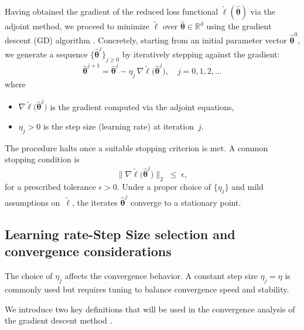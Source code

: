 Having obtained the gradient of the reduced loss functional $\tilde\ell(\hat{\bm\theta})$ via the adjoint method, we proceed to minimize $\tilde\ell$ over $\hat{\bm\theta}\in\mathbb{R}^d$ using the gradient descent (GD) algorithm \cite{ruder2017overviewgradientdescentoptimization,SENGUPTA2014521}.  Concretely, starting from an initial parameter vector $\hat{\bm\theta}^0$, we generate a sequence $\{\hat{\bm\theta}^j\}_{j\ge0}$ by iteratively stepping against the gradient:\\
\begin{equation}
    \hat{\bm\theta}^{j+1}
    = \hat{\bm\theta}^j
    - \eta_j \,\nabla \tilde\ell\bigl(\hat{\bm\theta}^j\bigr),
    \quad j = 0,1,2,\dots
    \label{eq:gd_update}
\end{equation}
where
\begin{itemize}
  \item $\nabla \tilde\ell\bigl(\hat{\bm\theta}^j\bigr)$ is the gradient computed via the adjoint equations,
  \item $\eta_j>0$ is the step size (learning rate) at iteration~$j$.
\end{itemize}
The procedure halts once a suitable stopping criterion is met. A common stopping condition is\\
\begin{equation}
    \|\nabla \tilde\ell\bigl(\hat{\bm\theta}^j\bigr)\|_2\;\le\;\epsilon,
    \label{eq:gd_stop}
\end{equation}
for a prescribed tolerance $\epsilon>0$.  Under a proper choice of $\{\eta_j\}$ and mild assumptions on~$\tilde\ell$, the iterates $\hat{\bm\theta}^j$ converge to a stationary point.

\subsection*{Learning rate-Step Size selection and convergence considerations}

The choice of $ \eta_j $ affects the convergence behavior. A constant step size $ \eta_j = \eta $ is commonly used but requires tuning to balance convergence speed and stability.

We introduce two key definitions that will be used in the convergence analysis of the gradient descent method \cite{garrigos2023handbook}.

